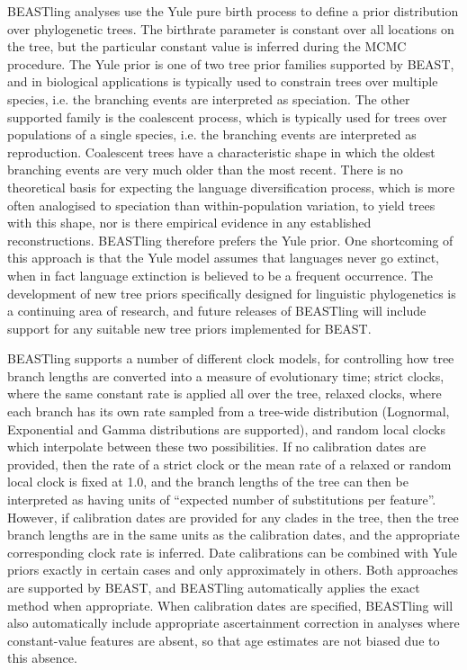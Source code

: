 \documentclass[10pt,a4paper]{article}
\begin{document}
BEASTling analyses use the Yule pure birth process\cite{Yule1924} to define a prior distribution over phylogenetic trees.  The birthrate parameter is constant over all locations on the tree, but the particular constant value is inferred during the MCMC procedure.  The Yule prior is one of two tree prior families supported by BEAST, and in biological applications is typically used to constrain trees over multiple species, i.e. the branching events are interpreted as speciation.  The other supported family is the coalescent process\cite{Kingman1982}, which is typically used for trees over populations of a single species, i.e. the branching events are interpreted as reproduction.  Coalescent trees have a characteristic shape in which the oldest branching events are very much older than the most recent.  There is no theoretical basis for expecting the language diversification process, which is more often analogised to speciation than within-population variation, to yield trees with this shape, nor is there empirical evidence in any established reconstructions.  BEASTling therefore prefers the Yule prior.  One shortcoming of this approach is that the Yule model assumes that languages never go extinct, when in fact language extinction is believed to be a frequent occurrence.  The development of new tree priors specifically designed for linguistic phylogenetics is a continuing area of research, and future releases of BEASTling will include support for any suitable new tree priors implemented for BEAST.

BEASTling supports a number of different clock models, for controlling how tree branch lengths are converted into a measure of evolutionary time; strict clocks, where the same constant rate is applied all over the tree, relaxed clocks\cite{Drummond2006}, where each branch has its own rate sampled from a tree-wide distribution (Lognormal, Exponential and Gamma distributions are supported), and random local clocks\cite{Drummond2010} which interpolate between these two possibilities.  If no calibration dates are provided, then the rate of a strict clock or the mean rate of a relaxed or random local clock is fixed at 1.0, and the branch lengths of the tree can then be interpreted as having units of ``expected number of substitutions per feature''.  However, if calibration dates are provided for any clades in the tree, then the tree branch lengths are in the same units as the calibration dates, and the appropriate corresponding clock rate is inferred.  Date calibrations can be combined with Yule priors exactly in certain cases\cite{Heled2011} and only approximately in others.  Both approaches are supported by BEAST, and BEASTling automatically applies the exact method when appropriate.  When calibration dates are specified, BEASTling will also automatically include appropriate ascertainment correction in analyses where constant-value features are absent, so that age estimates are not biased due to this absence.
\end{document}
